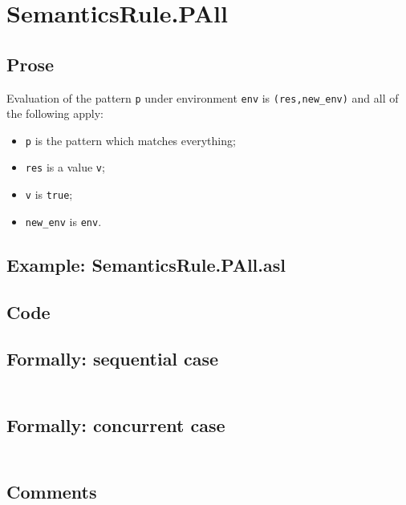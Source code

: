 \documentclass{book}
\begin{document}
\section{SemanticsRule.PAll \label{sec:SemanticsRule.PAll}}

  \subsection{Prose}
  Evaluation of the pattern \texttt{p} under environment \texttt{env} is
  \texttt{(res,new\_env)} and all of the following apply:
  \begin{itemize}  
  \item \texttt{p} is the pattern which matches everything;
  \item \texttt{res} is a value \texttt{v};
  \item \texttt{v} is \texttt{true};
  \item \texttt{new\_env} is \texttt{env}.
  \end{itemize}

  \subsection{Example: SemanticsRule.PAll.asl}

  \subsection{Code}

  \subsection{Formally: sequential case}
  \begin{align}
  \end{align} 

  \subsection{Formally: concurrent case}
  \begin{align}
  \end{align} 

  \subsection{Comments}
\end{document}
